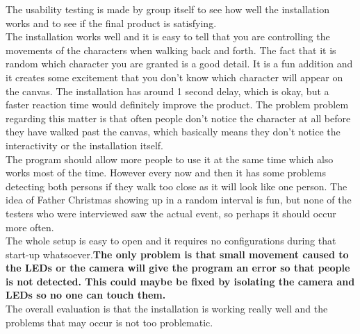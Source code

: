 The usability testing is made by group itself to see how well the installation works and to see if the final product is satisfying.\\
The installation works well and it is easy to tell that you are controlling the movements of the characters when walking back and forth. The fact that it is random which character you are granted is a good detail. It is a fun addition and it creates some excitement that you don't know which character will appear on the canvas. The installation has around 1 second delay, which is okay, but a faster reaction time would definitely improve the product. The problem problem regarding this matter is that often people don't notice the character at all before they have walked past the canvas, which basically means they don't notice the interactivity or the installation itself. \\
The program should allow more people to use it at the same time which also works most of the time. However every now and then it has some problems detecting both persons if they walk too close as it will look like one person.
The idea of Father Christmas showing up in a random interval is fun, but none of the testers who were interviewed saw the actual event, so perhaps it should occur more often.\\
The whole setup is easy to open and it requires no configurations during that start-up whatsoever.\textbf{The only problem is that small movement caused to the LEDs or the camera will give the program an error so that people is not detected. This could maybe be fixed by isolating the camera and LEDs so no one can touch them.}\\
The overall evaluation is that the installation is working really well and the problems that may occur is not too problematic. 

